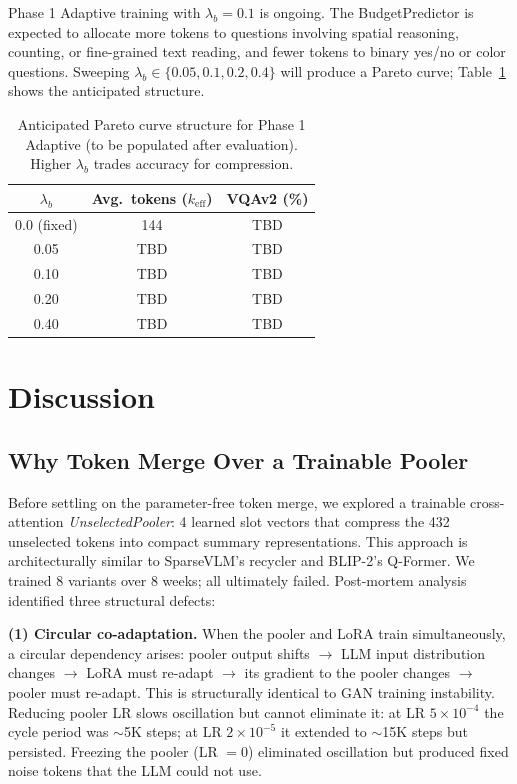 \documentclass{article}
\begin{document}
Phase 1 Adaptive training with $\lambda_b = 0.1$ is ongoing.
The BudgetPredictor is expected to allocate more tokens to questions involving spatial
reasoning, counting, or fine-grained text reading, and fewer tokens to binary yes/no
or color questions.
Sweeping $\lambda_b \in \{0.05, 0.1, 0.2, 0.4\}$ will produce a Pareto curve;
Table~\ref{tab:pareto} shows the anticipated structure.

\begin{table}[t]
\caption{Anticipated Pareto curve structure for Phase 1 Adaptive (to be populated after evaluation).
Higher $\lambda_b$ trades accuracy for compression.}
\label{tab:pareto}
\vskip 0.1in
\centering
\begin{small}
\begin{tabular}{ccc}
\toprule
$\lambda_b$ & Avg.\ tokens ($k_{\mathrm{eff}}$) & VQAv2 (\%) \\
\midrule
0.0 (fixed)  & 144 & TBD \\
0.05         & TBD & TBD \\
0.10         & TBD & TBD \\
0.20         & TBD & TBD \\
0.40         & TBD & TBD \\
\bottomrule
\end{tabular}
\end{small}
\end{table}

\section{Discussion}
\label{sec:discussion}

\subsection{Why Token Merge Over a Trainable Pooler}

Before settling on the parameter-free token merge, we explored a trainable
cross-attention \emph{UnselectedPooler}: 4 learned slot vectors that compress the
432 unselected tokens into compact summary representations.
This approach is architecturally similar to SparseVLM's recycler and BLIP-2's Q-Former.
We trained 8 variants over 8 weeks; all ultimately failed.
Post-mortem analysis identified three structural defects:

\textbf{(1) Circular co-adaptation.}
When the pooler and LoRA train simultaneously, a circular dependency arises:
pooler output shifts $\to$ LLM input distribution changes $\to$ LoRA must re-adapt
$\to$ its gradient to the pooler changes $\to$ pooler must re-adapt.
This is structurally identical to GAN training instability.
Reducing pooler LR slows oscillation but cannot eliminate it:
at LR $5\times10^{-4}$ the cycle period was $\sim$5K steps;
at LR $2\times10^{-5}$ it extended to $\sim$15K steps but persisted.
Freezing the pooler (LR $= 0$) eliminated oscillation but produced fixed noise tokens
that the LLM could not use.
\end{document}
